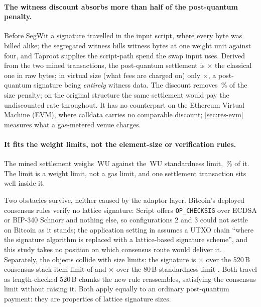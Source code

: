 \paragraph{The witness discount absorbs more than half of the post-quantum penalty.}
Before SegWit
\cite{bip141,bip144} a signature travelled in the input script, where every byte was billed
alike; the segregated witness bills witness bytes at one weight unit against four, and
Taproot \cite{bip341} supplies the script-path spend the swap input uses. Derived from the two mined transactions, the post-quantum settlement is
\btcMeasRawRatio$\times$ the classical one in raw bytes; in virtual size (what fees are
charged on) only \btcMeasVsizeRatio$\times$, a post-quantum signature being
\emph{entirely} witness data. The discount removes \btcMeasDiscountSaving\,\% of the size
penalty; on the original structure the same settlement would pay the undiscounted rate
throughout. It has no counterpart
on the Ethereum Virtual Machine (EVM), where calldata carries no
comparable discount; \cref{sec:res-evm} measures what a gas-metered venue charges.

\paragraph{It fits the weight limits, not the element-size or verification rules.}
The mined settlement weighs \btcMeasLasWeight{}\,WU against the
\btcMaxStdWeight{}\,WU standardness limit, \btcMeasPctStd\,\% of it. The limit is a
weight limit, not a gas limit, and one settlement transaction sits well inside it.

Two obstacles survive, neither caused by the adaptor layer. Bitcoin's deployed consensus
rules verify no lattice signature: Script offers \texttt{OP\_CHECKSIG} over ECDSA or BIP-340
Schnorr and nothing else, so configurations 2 and 3 could not settle on Bitcoin as it
stands; the application setting in \cite{esgin2020post} assumes a UTXO chain ``where the signature
algorithm is replaced with a lattice-based signature scheme'', and this study takes no
position on which consensus route would deliver it. Separately, the objects collide with
size limits: the signature is \btcSigOverElement$\times$ over the 520\,B
consensus stack-item limit of \cite{bip342} and \btcSigOverStdElement$\times$ over the
80\,B standardness limit \cite{bitcoincorepolicy}.
Both travel as length-checked 520\,B chunks the new rule reassembles, satisfying the consensus limit without raising it. Both apply equally to an ordinary post-quantum
payment: they are properties of lattice signature sizes.

